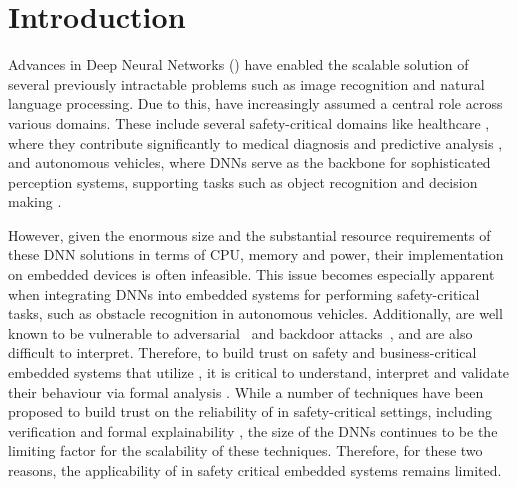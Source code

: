 
\section{Introduction}

Advances in Deep Neural Networks (\dnn) have enabled the scalable solution of
several previously intractable problems such as image recognition and natural
language processing. Due to this, \dnn have increasingly assumed a central role
across various domains. These include several safety-critical domains like
healthcare \cite{b1}, where they contribute significantly to medical
diagnosis and predictive analysis \cite{b2}, and autonomous vehicles, where
DNNs serve as the backbone for sophisticated perception systems, supporting
tasks such as object recognition and decision making \cite{b3}. 

However, given the enormous size and the substantial resource requirements of
these DNN solutions in terms of CPU, memory and power, their implementation
on embedded devices is often infeasible.  This issue
becomes especially apparent when integrating DNNs into embedded systems for
performing safety-critical tasks, such as obstacle recognition in autonomous
vehicles. Additionally, \dnn are well known to be vulnerable to
adversarial~\cite{l-bfgs,fgsm,deep-fool,pgd,ground-truth-adv-attack,cw-attack}
and backdoor
attacks~\cite{backdoor-poisoning}, and are also difficult to interpret.
Therefore, to build trust on safety and business-critical embedded systems
that utilize \dnn, it is critical to understand, interpret and validate their
behaviour via formal analysis
\cite{overview-fxai,minimal-image-fxai,backdoor-verification,nn-lander-verif,camera-verif-dsouza,generalization-verif}.
While a number of techniques have been proposed to build
trust on the reliability of \dnn in safety-critical settings, including
verification \cite{reluplex,deeppoly,crown,beta-crown,cegar-nn}  and formal
explainability \cite{overview-fxai,minimal-image-fxai}, the size of the DNNs
continues to be the limiting factor for the scalability of these techniques.
Therefore, for these two reasons, the applicability of \dnn in safety critical
 embedded systems remains limited.


